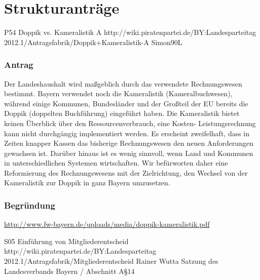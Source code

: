 \documentclass[12pt,a4paper,oneside]{scrbook}
\begin{document}

\clearpage






\chapter{Strukturanträge}\label{Strukturantraege} %









\positionspapier
{P54}
{Doppik vs. Kameralistik A}
{http://wiki.piratenpartei.de/BY:Landesparteitag 2012.1/Antragsfabrik/Doppik+Kameralistik-A}
{Simon90L}
\subsection{Antrag}
Der Landeshaushalt wird maßgeblich durch das
verwendete Rechnungswesen bestimmt. Bayern verwendet noch die Kameralistik
(Kameralbuchwesen), während einige Kommunen, Bundesländer und der Großteil der EU bereits
die Doppik (doppelten Buchführung) eingeführt haben. Die Kameralistik bietet keinen Überblick
über den Ressourcenverbrauch, eine Kosten- Leistungsrechnung kann nicht durchgängig
implementiert werden. Es erscheint zweifelhaft, dass in Zeiten knapper Kassen das bisherige
Rechnungswesen den neuen Anforderungen gewachsen ist. Darüber hinaus ist es wenig sinnvoll,
wenn Land und Kommunen in unterschiedlichen Systemen wirtschaften. Wir befürworten daher
eine Reformierung des Rechnungswesens mit der Zielrichtung, den Wechsel von der Kameralistik
zur Doppik in ganz Bayern umzusetzen.
\subsection{Begründung}
\url{http://www.fw-bayern.de/uploads/media/doppik-kameralistik.pdf}

\anderungsantrag
{S05}
{Einführung von Mitgliederentscheid}
{http://wiki.piratenpartei.de/BY:Landesparteitag 2012.1/Antragsfabrik/Mitgliederentscheid}
{Rainer Wutta}
{Satzung des Landesverbands Bayern / Abschnitt A§14}
\end{document}
